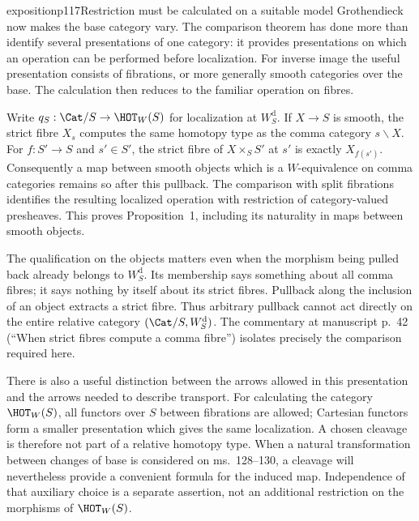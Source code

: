 \begin{dcomment}{exposition}{p117}{Restriction must be calculated on a suitable model}
Grothendieck now makes the base category vary. The comparison theorem has done more than identify several presentations of one category: it provides presentations on which an operation can be performed before localization. For inverse image the useful presentation consists of fibrations, or more generally smooth categories over the base. The calculation then reduces to the familiar operation on fibres.

Write $q_S:\Cat/S\to\HOT_W(S)$ for localization at $W_S^{\mathrm d}$. If $X\to S$ is smooth, the strict fibre $X_s$ computes the same homotopy type as the comma category $s\backslash X$. For $f:S'\to S$ and $s'\in S'$, the strict fibre of $X\times_S S'$ at $s'$ is exactly $X_{f(s')}$. Consequently a map between smooth objects which is a $W$-equivalence on comma categories remains so after this pullback. The comparison with split fibrations identifies the resulting localized operation with restriction of category-valued presheaves. This proves Proposition~1, including its naturality in maps between smooth objects.

The qualification on the objects matters even when the morphism being pulled back already belongs to $W_S^{\mathrm d}$. Its membership says something about all comma fibres; it says nothing by itself about its strict fibres. Pullback along the inclusion of an object extracts a strict fibre. Thus arbitrary pullback cannot act directly on the entire relative category $(\Cat/S,W_S^{\mathrm d})$. The commentary at manuscript p.~42 (``When strict fibres compute a comma fibre'') isolates precisely the comparison required here.

There is also a useful distinction between the arrows allowed in this presentation and the arrows needed to describe transport. For calculating the category $\HOT_W(S)$, all functors over $S$ between fibrations are allowed; Cartesian functors form a smaller presentation which gives the same localization. A chosen cleavage is therefore not part of a relative homotopy type. When a natural transformation between changes of base is considered on ms.~128--130, a cleavage will nevertheless provide a convenient formula for the induced map. Independence of that auxiliary choice is a separate assertion, not an additional restriction on the morphisms of $\HOT_W(S)$.
\end{dcomment}

